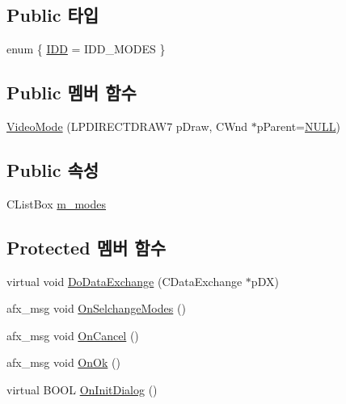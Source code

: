 \subsection*{Public 타입}
\begin{DoxyCompactItemize}
\item 
enum \{ \mbox{\hyperlink{class_video_mode_a5888f5e68b768e91695a058cace7e5a4a7012b5b58902e093e7c2a0547ef63dd5}{I\+DD}} = I\+D\+D\+\_\+\+M\+O\+D\+ES
 \}
\end{DoxyCompactItemize}
\subsection*{Public 멤버 함수}
\begin{DoxyCompactItemize}
\item 
\mbox{\hyperlink{class_video_mode_a1546b8240c6190c4c3f951ffcb74411c}{Video\+Mode}} (L\+P\+D\+I\+R\+E\+C\+T\+D\+R\+A\+W7 p\+Draw, C\+Wnd $\ast$p\+Parent=\mbox{\hyperlink{_system_8h_a070d2ce7b6bb7e5c05602aa8c308d0c4}{N\+U\+LL}})
\end{DoxyCompactItemize}
\subsection*{Public 속성}
\begin{DoxyCompactItemize}
\item 
C\+List\+Box \mbox{\hyperlink{class_video_mode_a89d4dd07ee169f0f6f4f845582fa3695}{m\+\_\+modes}}
\end{DoxyCompactItemize}
\subsection*{Protected 멤버 함수}
\begin{DoxyCompactItemize}
\item 
virtual void \mbox{\hyperlink{class_video_mode_a1ba1890dc2533e494de5f16ce05e59c5}{Do\+Data\+Exchange}} (C\+Data\+Exchange $\ast$p\+DX)
\item 
afx\+\_\+msg void \mbox{\hyperlink{class_video_mode_a8f9eece36c71ae9f171d53bf0cce9c68}{On\+Selchange\+Modes}} ()
\item 
afx\+\_\+msg void \mbox{\hyperlink{class_video_mode_ad50575dec1b43e682cdf94a998a5bc1a}{On\+Cancel}} ()
\item 
afx\+\_\+msg void \mbox{\hyperlink{class_video_mode_af9bcacc26657ea8610ae926f14fc648e}{On\+Ok}} ()
\item 
virtual B\+O\+OL \mbox{\hyperlink{class_video_mode_acb6a1c86e30e641be5e8d7f904547deb}{On\+Init\+Dialog}} ()
\end{DoxyCompactItemize}


